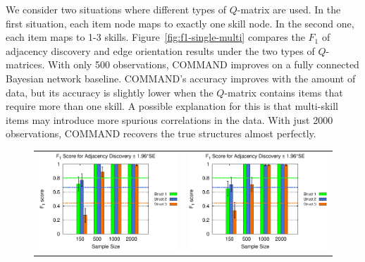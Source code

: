 \documentclass{edm_template}
\begin{document}
	We consider two situations where different types of $Q$-matrix are used. In the first situation,
	each item node maps to exactly one skill node. In the second one, each item maps to 1-3 skills. 
	Figure~\ref{fig:f1-single-multi} compares the $F_1$ of adjacency discovery and edge orientation results under the two types of $Q$-matrices.
	With only 500 observations, COMMAND improves on a fully connected Bayesian network baseline.
	COMMAND's  accuracy improves with the amount of data, but its accuracy is slightly lower when the $Q$-matrix contains items that require more than one skill. %
	A possible explanation for this is that multi-skill items may introduce more spurious correlations in the data.
	With just 2000 observations, COMMAND  recovers the true structures almost perfectly.
	
	\begin{figure}[ht]
		\begin{center}
			\begin{tabular}{>{\centering}m{1.5in} >{\centering\arraybackslash}m{1.5in}}
				\includegraphics[width=1.1\linewidth]{figures/F1A_single.eps} &\includegraphics[width=1.1\linewidth]{figures/F1A_multi.eps}\\

\end{tabular}
\end{center}
\end{figure}
\end{document}
